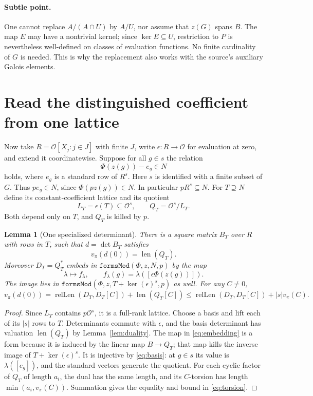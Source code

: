 \documentclass[11pt]{article}
\newtheorem{lemma}[theorem]{Lemma}
\newcommand{\Ocal}{\mathcal O}
\newcommand{\len}{\operatorname{len}}
\newcommand{\rl}{\operatorname{relLen}}
\newcommand{\val}{v_\pi}
\begin{document}
\paragraph{Subtle point.} One cannot replace $A/(A\cap U)$ by $A/U$, nor assume that $z(G)$ spans $B$. The map $E$ may have a nontrivial kernel; since $\ker E\subseteq U$, restriction to $P$ is nevertheless well-defined on classes of evaluation functions. No finite cardinality of $G$ is needed. This is why the replacement also works with the source's auxiliary Galois elements.

\section{Read the distinguished coefficient from one lattice}\label{sec:constant}
Now take $R=\Ocal[X_j:j\in J]$ with finite $J$, write $\epsilon:R\to\Ocal$ for evaluation at zero, and extend it coordinatewise. Suppose for all $g\in s$ the relation
\begin{equation}\label{eq:basis}
          \Phi(z(g))-e_g\in N
\end{equation}
holds, where $e_g$ is a standard row of $R^s$. Here $s$ is identified with a finite subset of $G$. Thus $p e_g\in N$, since $\Phi(pz(g))\in N$. In particular $pR^s\subseteq N$. For $T\supseteq N$ define its constant-coefficient lattice and its quotient
\[
 L_T=\epsilon(T)\subseteq\Ocal^s,\qquad Q_T=\Ocal^s/L_T.
\]
Both depend only on $T$, and $Q_T$ is killed by $p$.

\begin{lemma}[One specialized determinant]\label{lem:constant}
There is a square matrix $B_T$ over $R$ with rows in $T$, such that $d=\det B_T$ satisfies
\[
              \val(d(0))=\len(Q_T).
\]
Moreover $D_T=Q_T^*$ embeds in $\texttt{formsMod}(\Phi,z,N,p)$ by the map
\begin{equation}\label{eq:embedding}
  \lambda\longmapsto f_\lambda,\qquad
  f_\lambda(g)=\lambda([\epsilon\Phi(z(g))]).
\end{equation}
The image lies in $\texttt{formsMod}(\Phi,z,T+\ker(\epsilon)^s,p)$ as well. For any $C\ne0$,
\begin{equation}\label{eq:torsion}
 \val(d(0))=\rl(D_T,D_T[C])+\len(Q_T[C])
         \le\rl(D_T,D_T[C])+|s|\val(C).
\end{equation}
\end{lemma}
\begin{proof}
Since $L_T$ contains $p\Ocal^s$, it is a full-rank lattice. Choose a basis and lift each of its $|s|$ rows to $T$. Determinants commute with $\epsilon$, and the basis determinant has valuation $\len(Q_T)$ by Lemma~\ref{lem:duality}. The map in \eqref{eq:embedding} is a form because it is induced by the linear map $B\to Q_T$; that map kills the inverse image of $T+\ker(\epsilon)^s$. It is injective by \eqref{eq:basis}: at $g\in s$ its value is $\lambda([e_g])$, and the standard vectors generate the quotient. For each cyclic factor of $Q_T$ of length $a_i$, the dual has the same length, and its $C$-torsion has length $\min(a_i,\val(C))$. Summation gives the equality and bound in \eqref{eq:torsion}.
\end{proof}
\end{document}
